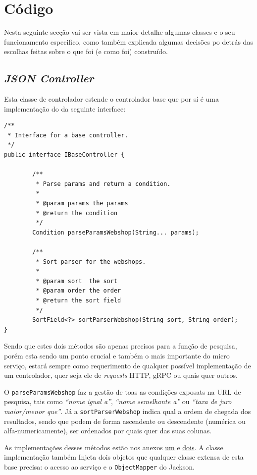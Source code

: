 \newpage

\section{Código}

Nesta seguinte secção vai ser vista em maior detalhe algumas classes e o seu funcionamento especifico, como também explicada algumas decisões po detrás das escolhas feitas sobre o que foi (e como foi) construído.

\subsection{\textit{JSON Controller}}

Esta classe de controlador estende o controlador base que por sí é uma implementação do da seguinte interface:

\begin{verbatim}
/**
 * Interface for a base controller.
 */
public interface IBaseController {
        
        /**
         * Parse params and return a condition.
         *
         * @param params the params
         * @return the condition
         */
        Condition parseParamsWebshop(String... params);
        
        /**
         * Sort parser for the webshops.
         *
         * @param sort  the sort
         * @param order the order
         * @return the sort field
         */
        SortField<?> sortParserWebshop(String sort, String order);
}
\end{verbatim}

Sendo que estes dois métodos são apenas precisos para a função de pesquisa, porém esta sendo um ponto crucial e também o mais importante do micro serviço, estará sempre como requerimento de qualquer possível implementação de um controlador, quer seja ele de \textit{requests} HTTP, gRPC ou quais quer outros.

O \texttt{parseParamsWebshop} faz a gestão de toas as condições exposats na URL de pesquisa, tais como \textit{``nome igual a''}, \textit{``nome semelhante a''} ou \textit{``taxa de juro maior/menor que''}. Já a \texttt{sortParserWebshop} indica qual a ordem de chegada dos resultados, sendo que podem de forma ascendente ou descendente (numérica ou alfa-numericamente), ser ordenados por quais quer das suas colunas.

As implementações desses métodos estão nos anexos \hyperref[an1]{um} e \hyperref[an2]{dois}. A classe implementação também Injeta dois objetos que qualquer classe extensa de esta base precisa: o acesso ao serviço e o \texttt{ObjectMapper} do Jackson.

